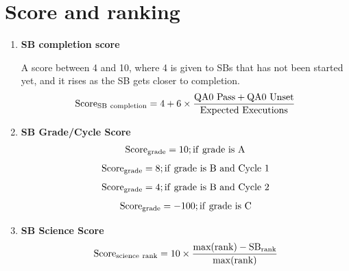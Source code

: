 \documentclass[a4paper,10pt,english]{sphinxmanual}
\begin{document}
\section{Score and ranking}
\label{algorithm:score}\label{algorithm:score-and-ranking}\begin{enumerate}
\item {} 
\textbf{SB completion score}

A score between 4 and 10, where 4 is given to SBs that has not been started
yet, and it rises as the SB gets closer to completion.
\begin{gather}
\begin{split}\rm{Score}_{\rm{SB\ completion}} =
4 + 6 \times \frac{\rm{QA0\ Pass} + \rm{QA0\ Unset}}{\rm{Expected\ Executions}}\end{split}\notag
\end{gather}
\item {} 
\textbf{SB Grade/Cycle Score}
\label{algorithm:equation-gA}\begin{gather}
\begin{split}\rm{Score}_{\rm{grade}} = 10 ; \rm{if\ grade\ is\ A}\end{split}\label{algorithm-gA}
\end{gather}\label{algorithm:equation-gBc1}\begin{gather}
\begin{split}\rm{Score}_{\rm{grade}} = 8  ; \rm{if\ grade\ is\ B\ and\ Cycle\ 1}\end{split}\label{algorithm-gBc1}
\end{gather}\label{algorithm:equation-gBc2}\begin{gather}
\begin{split}\rm{Score}_{\rm{grade}} = 4  ; \rm{if\ grade\ is\ B\ and\ Cycle\ 2}\end{split}\label{algorithm-gBc2}
\end{gather}\label{algorithm:equation-gC}\begin{gather}
\begin{split}\rm{Score}_{\rm{grade}} = -100 ; \rm{if\ grade\ is\ C}\end{split}\label{algorithm-gC}
\end{gather}
\item {} 
\textbf{SB Science Score}
\begin{gather}
\begin{split}\rm{Score}_{\rm{science\ rank}} =
10 \times \frac{\rm{max(rank)} - \rm{SB}_{\rm{rank}}}{\rm{max(rank)}}\end{split}\notag

\end{gather}
\end{enumerate}
\end{document}
